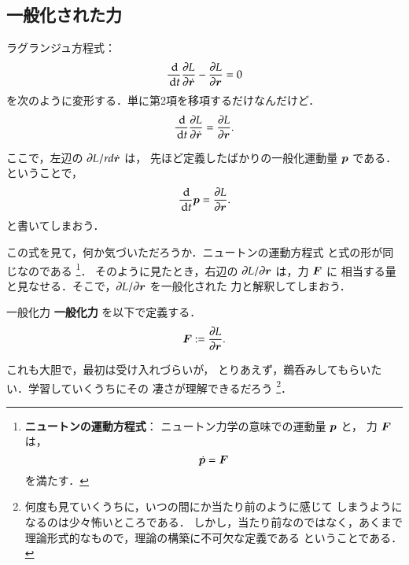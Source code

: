         \subsection{一般化された力}
            ラグランジュ方程式：
            \begin{equation*}
                \frac{\,\mathrm{d}}{\,\mathrm{d} t}\frac{\partial L}{\partial \dot{\boldsymbol{r}}} - \frac{\partial L}{\partial \boldsymbol{r}} = 0
            \end{equation*}
            を次のように変形する．単に第2項を移項するだけなんだけど．
            \begin{equation*}
                \frac{\,\mathrm{d}}{\,\mathrm{d} t}\frac{\partial L}{\partial \dot{\boldsymbol{r}}} = \frac{\partial L}{\partial \boldsymbol{r}}.
            \end{equation*}

            ここで，左辺の $\partial L/rd \dot{\boldsymbol{r}}$ は，
            先ほど定義したばかりの一般化運動量 $\boldsymbol{p}$ である．ということで，
            \begin{equation*}
                \frac{\,\mathrm{d}}{\,\mathrm{d} t} \boldsymbol{p} = \frac{\partial L}{\partial \boldsymbol{r}}.
            \end{equation*}
            と書いてしまおう．

            この式を見て，何か気づいただろうか．ニュートンの運動方程式
            と式の形が同じなのである
                \footnote{
                    \textbf{ニュートンの運動方程式}：
                    ニュートン力学の意味での運動量 $\boldsymbol{p}$ と，
                    力 $\boldsymbol{F}$ は，
                        \begin{equation*}
                            \dot{\boldsymbol{p}} = \boldsymbol{F}
                        \end{equation*}
                    を満たす．
                }．
            そのように見たとき，右辺の $\partial L/\partial \boldsymbol{r}$ は，力 $\boldsymbol{F}$ に
            相当する量と見なせる．そこで，$\partial L/\partial \boldsymbol{r}$ を一般化された
            力と解釈してしまおう．
                \begin{myshadebox}{一般化力}
                    \textbf{一般化力} を以下で定義する．
                    \begin{align}
                        \boldsymbol{F} := \frac{\partial L}{\partial \boldsymbol{r}}.
                    \end{align}
                \end{myshadebox}

            これも大胆で，最初は受け入れづらいが，
            とりあえず，鵜呑みしてもらいたい．学習していくうちにその
            凄さが理解できるだろう
                \footnote{
                    何度も見ていくうちに，いつの間にか当たり前のように感じて
                    しまうようになるのは少々怖いところである．
                    しかし，当たり前なのではなく，あくまで
                    理論形式的なもので，理論の構築に不可欠な定義である
                    ということである．
                }．

